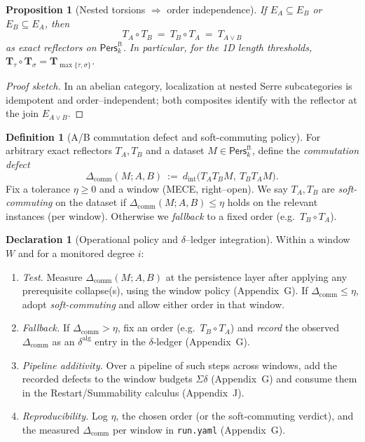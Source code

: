 \documentclass[11pt]{article}
\DeclareRobustCommand{\hyp}{\nobreakdash-}
\newcommand{\Pers}{\mathsf{Pers}}
\numberwithin{equation}{section}
\newtheorem{proposition}[theorem]{Proposition}
\theoremstyle{definition}
\newtheorem{definition}[theorem]{Definition}
\newtheorem{declaration}[theorem]{Declaration}
\begin{document}
\begin{proposition}[Nested torsions \(\Rightarrow\) order independence]\label{K:prop:nested}
If \(E_A\subseteq E_B\) or \(E_B\subseteq E_A\), then
\[
T_A\circ T_B\ =\ T_B\circ T_A\ =\ T_{A\vee B}
\]
as exact reflectors on \(\Pers^{\mathrm{ft}}_k\).
In particular, for the 1D length thresholds, \(\mathbf{T}_\tau\circ \mathbf{T}_\sigma=\mathbf{T}_{\max\{\tau,\sigma\}}\).
\end{proposition}

\begin{proof}[Proof sketch]
In an abelian category, localization at nested Serre subcategories is idempotent and order–independent; both composites identify with the reflector at the join \(E_{A\vee B}\).
\end{proof}

\begin{definition}[A/B commutation defect and soft\hyp commuting policy]\label{K:def:soft}
For arbitrary exact reflectors \(T_A,T_B\) and a dataset \(M\in\Pers^{\mathrm{ft}}_k\), define the \emph{commutation defect}
\[
\Delta_{\mathrm{comm}}(M;A,B)\ :=\ d_{\mathrm{int}}\big(T_AT_BM,\ T_BT_AM\big).
\]
Fix a tolerance \(\eta\ge 0\) and a window (MECE, right–open). We say \(T_A,T_B\) are \emph{soft\hyp commuting} on the dataset if \(\Delta_{\mathrm{comm}}(M;A,B)\le \eta\) holds on the relevant instances (per window). Otherwise we \emph{fallback} to a fixed order (e.g.\ \(T_B\circ T_A\)).
\end{definition}

\begin{declaration}[Operational policy and $\delta$–ledger integration]\label{K:dec:soft-policy}
Within a window \(W\) and for a monitored degree \(i\):
\begin{enumerate}\itemsep0.2em
  \item \emph{Test.} Measure \(\Delta_{\mathrm{comm}}(M;A,B)\) at the persistence layer after applying any prerequisite collapse(s), using the window policy (Appendix~G). If \(\Delta_{\mathrm{comm}}\le \eta\), adopt \emph{soft\hyp commuting} and allow either order in that window.
  \item \emph{Fallback.} If \(\Delta_{\mathrm{comm}}>\eta\), fix an order (e.g.\ \(T_B\circ T_A\)) and \emph{record} the observed \(\Delta_{\mathrm{comm}}\) as an \(\delta^{\mathrm{alg}}\) entry in the \(\delta\)\hyp ledger (Appendix~G).
  \item \emph{Pipeline additivity.} Over a pipeline of such steps across windows, add the recorded defects to the window budgets \(\Sigma\delta\) (Appendix~G) and consume them in the Restart/Summability calculus (Appendix~J).
  \item \emph{Reproducibility.} Log \(\eta\), the chosen order (or the soft\hyp commuting verdict), and the measured \(\Delta_{\mathrm{comm}}\) per window in \texttt{run.yaml} (Appendix~G).
\end{enumerate}
\end{declaration}
\end{document}
